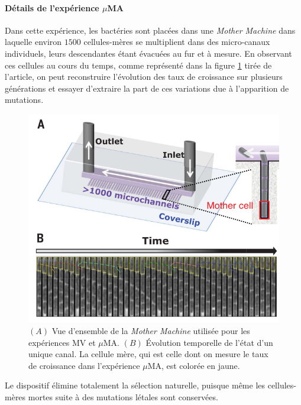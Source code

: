 \documentclass[12pt]{article}
\begin{document}
\paragraph{Détails de l'expérience $\mu$MA}

Dans cette expérience, les bactéries sont placées dans une \emph{Mother Machine} dans laquelle environ $1500$ cellules-mères se multiplient dans des micro-canaux individuels, leurs descendantes étant évacuées au fur et à mesure. En observant ces cellules au cours du temps, comme représenté dans la figure \ref{fig:microMA} tirée de l'article, on peut reconstruire l'évolution des taux de croissance sur plusieurs générations et essayer d'extraire la part de ces variations due à l'apparition de mutations.

\begin{figure}[h]
  \begin{center}
    \vspace{3mm}
    \includegraphics[scale=0.4]{../Img/Schema_microMA.png}
  \end{center} 
  \caption{\label{fig:microMA}$(A)$ Vue d'ensemble de la \emph{Mother Machine} utilisée pour les expériences MV et $\mu$MA. $(B)$ Évolution temporelle de l'état d'un unique canal. La cellule mère, qui est celle dont on mesure le taux de croissance dans l'expérience $\mu$MA, est colorée en jaune.}
\end{figure}

Le dispositif élimine totalement la sélection naturelle, puisque même les cellules-mères mortes suite à des mutations létales sont conservées.
\end{document}
